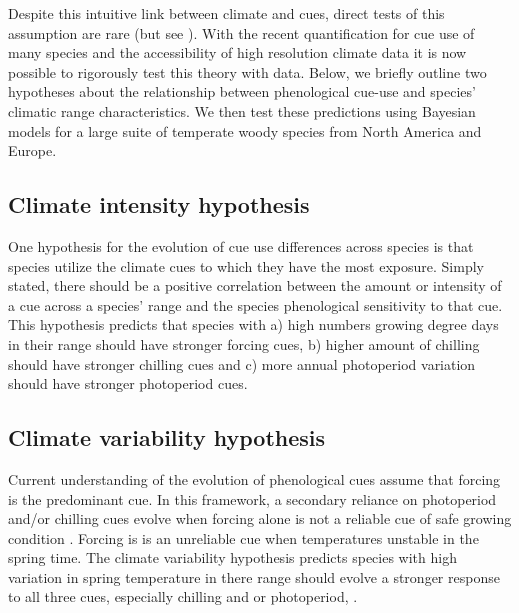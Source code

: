 \documentclass[12pt]{article}\usepackage[]{graphicx}\usepackage[]{color}
\begin{document}
Despite this intuitive link between climate and cues, direct tests of this assumption are rare (but see \citep{Zohner:2017aa}). With the recent quantification for cue use of many species \citep{Ettinger:2020aa} and the accessibility of high resolution climate data it is now possible to rigorously test this theory with data. Below, we briefly outline two hypotheses about the relationship between phenological cue-use and species' climatic range characteristics. We then test these predictions using Bayesian models for a large suite of temperate woody species from North America and Europe.

\subsection{Climate intensity hypothesis}
One hypothesis for the evolution of cue use differences across species is that species utilize the climate cues to which they have the most exposure. Simply stated, there should be a positive correlation between the amount or intensity of a cue across a species' range and the species phenological sensitivity to that cue. This hypothesis predicts that species with  a) high numbers growing degree days in their range should have stronger forcing cues, b) higher amount of chilling should have stronger chilling cues and c) more annual photoperiod variation should have stronger photoperiod cues. %

\subsection{Climate variability hypothesis}

Current understanding of the evolution of phenological cues assume that forcing is the predominant cue. In this framework, a secondary reliance on photoperiod and/or chilling cues evolve when forcing alone is not a reliable cue of safe growing condition \citep{Korner:2010aa}. Forcing is is an unreliable cue when temperatures unstable in the spring time. The climate variability hypothesis predicts species with high variation in spring temperature in there range should evolve a stronger response to all three cues, especially chilling and or photoperiod,  \citep{Wang:2014aa, Muffler2016}. %
\end{document}
